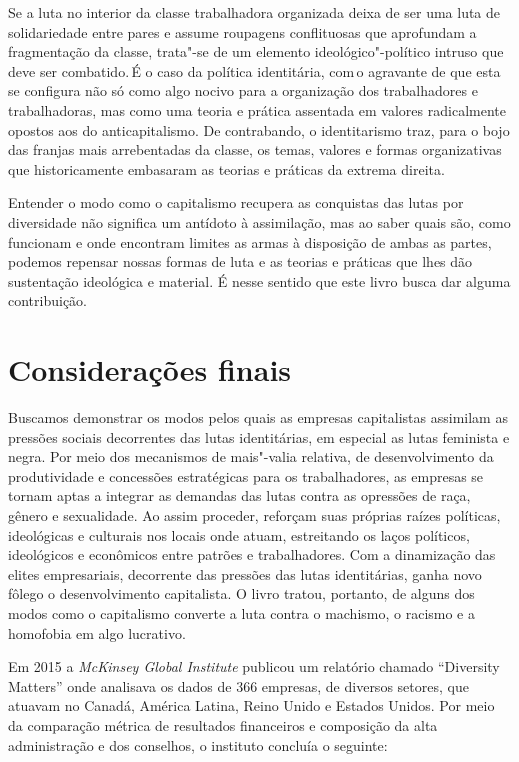 Se a luta no interior da classe trabalhadora organizada deixa de ser
uma luta de solidariedade entre pares e assume roupagens conflituosas
que aprofundam a fragmentação da classe, trata"-se de um elemento
ideológico"-político intruso que deve ser combatido.\,É o caso da
política identitária, com\,o agravante de que esta se configura
não só como algo nocivo para a organização dos trabalhadores e
trabalhadoras, mas como uma teoria e prática assentada em valores
radicalmente opostos aos do anticapitalismo. De contrabando, o
identitarismo traz, para o bojo das franjas mais arrebentadas da classe,
os temas, valores e formas organizativas que historicamente embasaram as
teorias e práticas da extrema direita.

Entender o modo como o capitalismo recupera as conquistas das lutas por
diversidade não significa um antídoto à assimilação, mas ao saber quais
são, como funcionam e onde encontram limites as armas à disposição de
ambas as partes, podemos repensar nossas formas de luta e as teorias e
práticas que lhes dão sustentação ideológica e material. É nesse sentido
que este livro busca dar alguma contribuição.

\chapter{Considerações finais}

Buscamos demonstrar os modos pelos quais as empresas capitalistas
assimilam as pressões sociais decorrentes das lutas identitárias, em
especial as lutas feminista e negra. Por meio dos mecanismos de
mais"-valia relativa, de desenvolvimento da produtividade e concessões
estratégicas para os trabalhadores, as empresas se tornam aptas a
integrar as demandas das lutas contra as opressões de raça, gênero e
sexualidade. Ao assim proceder, reforçam suas próprias raízes políticas,
ideológicas e culturais nos locais onde atuam, estreitando os laços
políticos, ideológicos e econômicos entre patrões e trabalhadores. Com a
dinamização das elites empresariais, decorrente das pressões das lutas
identitárias, ganha novo fôlego o desenvolvimento capitalista. O livro
tratou, portanto, de alguns dos modos como o capitalismo converte a luta
contra o machismo, o racismo e a homofobia em algo lucrativo.

Em 2015 a \emph{McKinsey Global Institute} publicou um relatório chamado
``Diversity Matters'' onde analisava os dados de 366 empresas, de
diversos setores, que atuavam no Canadá, América Latina, Reino Unido e
Estados Unidos. Por meio da comparação métrica de resultados financeiros
e composição da alta administração e dos conselhos, o instituto concluía
o seguinte:

